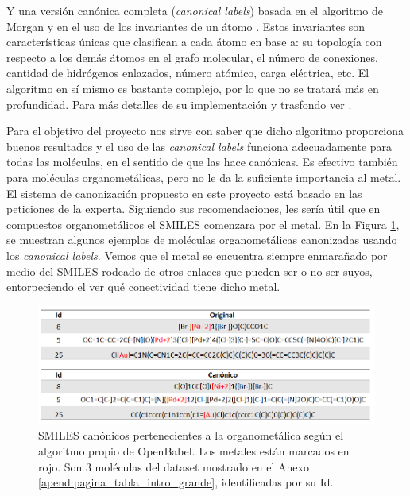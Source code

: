 Y una versión canónica completa (\textit{canonical labels}) basada en el algoritmo de Morgan y en el uso de los invariantes de un átomo \cite{vogt_powerpoint, apodaca_computing_2019}. Estos invariantes son características únicas que clasifican a cada átomo en base a: su topología con respecto a los demás átomos en el grafo molecular, el número de conexiones, cantidad de hidrógenos enlazados, número atómico, carga eléctrica, etc. El algoritmo en sí mismo es bastante complejo, por lo que no se tratará más en profundidad. Para más detalles de su implementación y trasfondo ver \cite{weininger_smiles_1989, canonical_coding_algorithm, jochum_canonical_1977, vogt_powerpoint}. 

Para el objetivo del proyecto nos sirve con saber que dicho algoritmo proporciona buenos resultados y el uso de las \textit{canonical labels} funciona adecuadamente para todas las moléculas, en el sentido de que las hace canónicas. Es efectivo también para moléculas organometálicas, pero no le da la suficiente importancia al metal. El sistema de canonización propuesto en este proyecto está basado en las peticiones de la experta. Siguiendo sus recomendaciones, les sería útil que en compuestos organometálicos el SMILES comenzara por el metal. En la Figura \ref{fig:canonicos_mal_implementacion}, se muestran algunos ejemplos de moléculas organometálicas canonizadas usando los \textit{canonical labels}. Vemos que el metal se encuentra siempre enmarañado por medio del SMILES rodeado de otros enlaces que pueden ser o no ser suyos, entorpeciendo el ver qué conectividad tiene dicho metal. 

\begin{figure}[h!]
    \centering
    \includegraphics[scale=0.5]{imagenes/diseno/canonizado/canonicos_mal_implementacion.png}
    \caption{SMILES canónicos pertenecientes a la organometálica según el algoritmo propio de OpenBabel. Los metales están marcados en rojo. Son 3 moléculas del dataset mostrado en el Anexo \ref{apend:pagina_tabla_intro_grande}, identificadas por su Id.} 
    \label{fig:canonicos_mal_implementacion}
\end{figure}



